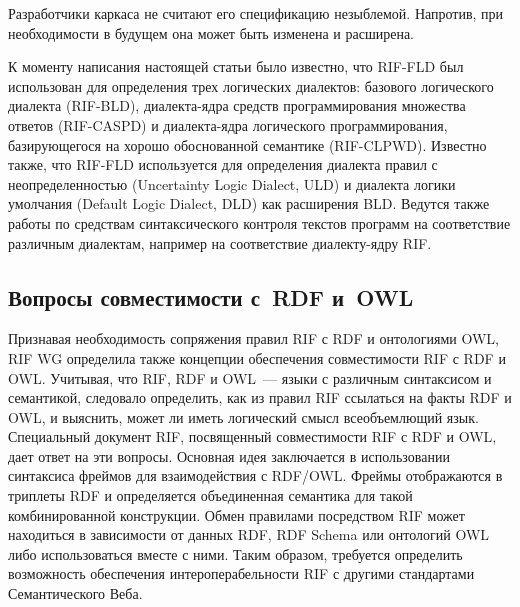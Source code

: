 \begin{multicols}{2}
Разработчики каркаса не считают его спецификацию незыблемой. Напротив, при 
необходимости в будущем она может быть изменена и расширена. 

К моменту написания настоящей статьи было известно, что RIF-FLD был использован для 
определения трех логических диалектов: базового логического диалекта (RIF-BLD), 
диа\-лек\-та-яд\-ра средств программирования множества ответов (RIF-CASPD) и диа\-лек\-та-яд\-ра 
логического программирования, базирующегося на хорошо обоснованной семантике 
(RIF-CLPWD). Известно также, что RIF-FLD используется для определения диалекта правил с 
неопределенностью (Uncertainty Logic Dialect, ULD) и диалекта логики умолчания 
(Default Logic Dialect, DLD) как расширения BLD. 
Ведутся также работы по средствам синтаксического контроля текстов программ на 
соответствие различным диалектам, например на соответствие диа\-лек\-ту-яд\-ру RIF.

\vspace*{-6pt}
   
   \subsection{Вопросы совместимости с~RDF и~OWL} %

Признавая необходимость сопряжения правил RIF с RDF и онтологиями OWL, RIF WG 
определила также концепции обеспечения совместимости RIF с RDF и OWL. Учитывая, что 
RIF, RDF и OWL~--- языки с различным синтаксисом и семантикой, следовало определить, 
как из правил RIF ссылаться на факты RDF и OWL, и выяснить, может ли иметь логический 
смысл всеобъемлющий язык. Специальный документ RIF, посвященный совместимости RIF 
с RDF и OWL, дает ответ на эти вопросы. Основная идея заключается в использовании 
синтаксиса фреймов для взаимодействия с RDF/OWL. Фреймы отображаются в триплеты 
RDF и определяется объединенная семантика для такой комбинированной конструкции. 
Обмен правилами посредством RIF может находиться в зависимости от данных RDF, RDF 
Schema или онтологий OWL либо использоваться вместе с ними. Таким образом, требуется 
определить возможность обеспечения интероперабельности RIF с другими стандартами 
Семантического Веба. 


\end{multicols}
